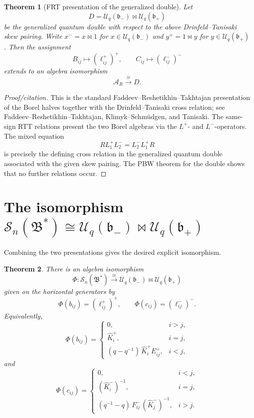 \documentclass[11pt]{article}
\newtheorem{theorem}{Theorem}[section]
\newcommand{\Uc}{\mathcal U}
\newcommand{\Sc}{\mathcal S}
\newcommand{\fb}{\mathfrak b}
\newcommand{\fB}{\mathfrak B}
\begin{document}
\begin{theorem}[FRT presentation of the generalized double]
Let
\[
D=\Uc_q(\fb_-)\bowtie \Uc_q(\fb_+)
\]
be the generalized quantum double with respect to the above Drinfeld--Tanisaki skew pairing.  Write \(x^-=x\bowtie 1\) for \(x\in \Uc_q(\fb_-)\) and \(y^+=1\bowtie y\) for \(y\in \Uc_q(\fb_+)\).  Then the assignment
\[
B_{ij}\longmapsto (\ell^+_{ij})^+,\qquad
C_{ij}\longmapsto (\ell^-_{ij})^-
\]
extends to an algebra isomorphism
\[
\mathcal A_R \xrightarrow{\ \cong\ } D .
\]
\end{theorem}

\begin{proof}[Proof/citation]
This is the standard Faddeev--Reshetikhin--Takhtajan presentation of the Borel halves together with the Drinfeld--Tanisaki cross relation; see Faddeev--Reshetikhin--Takhtajan, Klimyk--Schm\"udgen, and Tanisaki.  The same-sign RTT relations present the two Borel algebras via the \(L^+\)- and \(L^-\)-operators.  The mixed equation
\[
R L^+_1L^-_2=L^-_2L^+_1R
\]
is precisely the defining cross relation in the generalized quantum double associated with the given skew pairing.  The PBW theorem for the double shows that no further relations occur.
\end{proof}

\section{The isomorphism \(\Sc_n(\fB^*)\cong \Uc_q(\fb_-)\bowtie\Uc_q(\fb_+)\)}

Combining the two presentations gives the desired explicit isomorphism.

\begin{theorem}
There is an algebra isomorphism
\[
\Phi:\Sc_n(\fB^*)\xrightarrow{\ \cong\ }
\Uc_q(\fb_-)\bowtie \Uc_q(\fb_+)
\]
given on the horizontal generators by
\[
\Phi(b_{ij})=(\ell^+_{ij})^+,\qquad
\Phi(c_{ij})=(\ell^-_{ij})^- .
\]
Equivalently,
\[
\Phi(b_{ij})=
\begin{cases}
0,& i>j,\\[2mm]
\widehat K_i^+,& i=j,\\[2mm]
(q-q^{-1})\,\widehat K_i^+ E_{ij}^+,& i<j,
\end{cases}
\]
and
\[
\Phi(c_{ij})=
\begin{cases}
0,& i<j,\\[2mm]
(\widehat K_i^-)^{-1},& i=j,\\[2mm]
(q^{-1}-q)\,F_{ij}^-\,(\widehat K_j^-)^{-1},& i>j.
\end{cases}
\]
\end{theorem}
\end{document}
